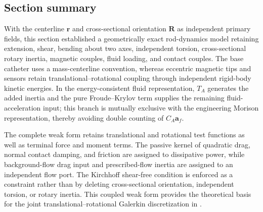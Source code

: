 \subsection{Section summary}\label{sec:rod-1-8}

With the centerline \(\mathbf{r}\) and cross-sectional orientation \(\mathbf{R}\) as independent primary fields, this section established a geometrically exact rod-dynamics model retaining extension, shear, bending about two axes, independent torsion, cross-sectional rotary inertia, magnetic couples, fluid loading, and contact couples. The base catheter uses a mass-centerline convention, whereas eccentric magnetic tips and sensors retain translational--rotational coupling through independent rigid-body kinetic energies. In the energy-consistent fluid representation, \(T_{A}\) generates the added inertia and the pure Froude--Krylov term supplies the remaining fluid-acceleration input; this branch is mutually exclusive with the engineering Morison representation, thereby avoiding double counting of \(C_{A}\mathbf{a}_{f}\).

The complete weak form retains translational and rotational test functions as well as terminal force and moment terms. The passive kernel of quadratic drag, normal contact damping, and friction are assigned to dissipative power, while background-flow drag input and prescribed-flow inertia are assigned to an independent flow port. The Kirchhoff shear-free condition is enforced as a constraint rather than by deleting cross-sectional orientation, independent torsion, or rotary inertia. This coupled weak form provides the theoretical basis for the joint translational--rotational Galerkin discretization in .
